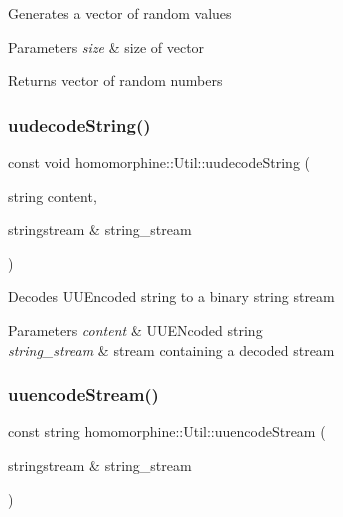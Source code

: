 Generates a vector of random values


\begin{DoxyParams}{Parameters}
{\em size} & size of vector \\
\hline
\end{DoxyParams}
\begin{DoxyReturn}{Returns}
vector of random numbers 
\end{DoxyReturn}
\mbox{\label{classhomomorphine_1_1_util_aba5af6d7356aca8c70ae4fb1e5d36b70}} 
\subsubsection{\texorpdfstring{uudecode\+String()}{uudecodeString()}}
{\footnotesize\ttfamily const void homomorphine\+::\+Util\+::uudecode\+String (\begin{DoxyParamCaption}\item[{string}]{content,  }\item[{stringstream \&}]{string\+\_\+stream }\end{DoxyParamCaption})\hspace{0.3cm}{\ttfamily [static]}}

Decodes U\+U\+Encoded string to a binary string stream


\begin{DoxyParams}{Parameters}
{\em content} & U\+U\+E\+Ncoded string \\
\hline
{\em string\+\_\+stream} & stream containing a decoded stream \\
\hline
\end{DoxyParams}
\mbox{\label{classhomomorphine_1_1_util_a26f29995aa48f4374993ec4afeca2ac8}} 
\subsubsection{\texorpdfstring{uuencode\+Stream()}{uuencodeStream()}}
{\footnotesize\ttfamily const string homomorphine\+::\+Util\+::uuencode\+Stream (\begin{DoxyParamCaption}\item[{stringstream \&}]{string\+\_\+stream }\end{DoxyParamCaption})\hspace{0.3cm}{\ttfamily [static]}}

